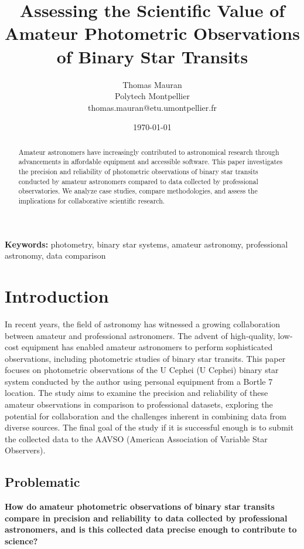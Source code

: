 \documentclass[12pt,a4paper]{article}
\title{Assessing the Scientific Value of Amateur Photometric Observations of Binary Star Transits}
\author{Thomas Mauran \\\small Polytech Montpellier  \\\small thomas.mauran@etu.umontpellier.fr}
\date{\today}
\begin{document}
\maketitle

\begin{abstract}
Amateur astronomers have increasingly contributed to astronomical research through advancements in affordable equipment and accessible software. This paper investigates the precision and reliability of photometric observations of binary star transits conducted by amateur astronomers compared to data collected by professional observatories. We analyze case studies, compare methodologies, and assess the implications for collaborative scientific research.
\end{abstract}

\textbf{Keywords:} photometry, binary star systems, amateur astronomy, professional astronomy, data comparison

\newpage

\tableofcontents

\newpage

\section{Introduction}
In recent years, the field of astronomy has witnessed a growing collaboration between amateur 
and professional astronomers. The advent of high-quality, low-cost equipment has enabled 
amateur astronomers to perform sophisticated observations, including photometric studies of 
binary star transits. This paper focuses on photometric observations of the U Cephei 
(U Cephei) binary star system conducted by the author using personal equipment from a 
Bortle 7 location. The study aims to examine the precision and reliability of these amateur 
observations in comparison to professional datasets, exploring the potential for collaboration
and the challenges inherent in combining data from diverse sources. The final goal of the study if it is 
successful enough is to submit the collected data to the AAVSO (American Association of Variable Star Observers).

\subsection{Problematic}

\medskip

\textbf{How do amateur photometric observations of binary star transits compare in precision and reliability to data collected by professional astronomers, and is this collected data precise enough to contribute to science?}
\end{document}
